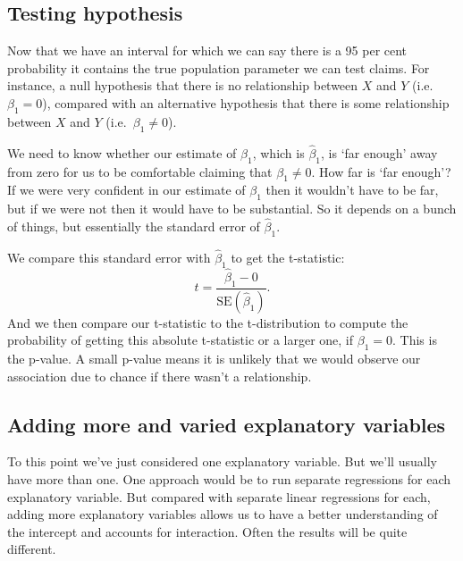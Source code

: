 \documentclass[
]{book}
\begin{document}
\hypertarget{testing-hypothesis}{%
\subsection{Testing hypothesis}\label{testing-hypothesis}}

Now that we have an interval for which we can say there is a 95 per cent probability it contains the true population parameter we can test claims. For instance, a null hypothesis that there is no relationship between \(X\) and \(Y\) (i.e.~\(\beta_1 = 0\)), compared with an alternative hypothesis that there is some relationship between \(X\) and \(Y\) (i.e.~\(\beta_1 \neq 0\)).

We need to know whether our estimate of \(\beta_1\), which is \(\hat{\beta}_1\), is `far enough' away from zero for us to be comfortable claiming that \(\beta_1 \neq 0\). How far is `far enough'? If we were very confident in our estimate of \(\beta_1\) then it wouldn't have to be far, but if we were not then it would have to be substantial. So it depends on a bunch of things, but essentially the standard error of \(\hat{\beta}_1\).

We compare this standard error with \(\hat{\beta}_1\) to get the t-statistic:
\[t = \frac{\hat{\beta}_1 - 0}{\mbox{SE}(\hat{\beta}_1)}.\]
And we then compare our t-statistic to the t-distribution to compute the probability of getting this absolute t-statistic or a larger one, if \(\beta_1 = 0\). This is the p-value. A small p-value means it is unlikely that we would observe our association due to chance if there wasn't a relationship.

\hypertarget{adding-more-and-varied-explanatory-variables}{%
\subsection{Adding more and varied explanatory variables}\label{adding-more-and-varied-explanatory-variables}}

To this point we've just considered one explanatory variable. But we'll usually have more than one. One approach would be to run separate regressions for each explanatory variable. But compared with separate linear regressions for each, adding more explanatory variables allows us to have a better understanding of the intercept and accounts for interaction. Often the results will be quite different.
\end{document}

